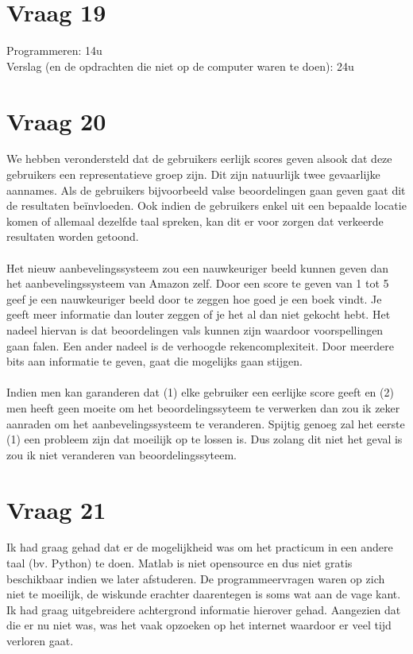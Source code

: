 \documentclass[11pt,a4paper]{article}
\begin{document}
\section*{Vraag 19}
Programmeren: 14u\\
Verslag (en de opdrachten die niet op de computer waren te doen): 24u 

\section*{Vraag 20}
We hebben verondersteld dat de gebruikers eerlijk scores geven alsook dat deze gebruikers een representatieve groep zijn. Dit zijn natuurlijk twee gevaarlijke aannames. Als de gebruikers bijvoorbeeld valse beoordelingen gaan geven gaat dit de resultaten beïnvloeden. Ook indien de gebruikers enkel uit een bepaalde locatie komen of allemaal dezelfde taal spreken, kan dit er voor zorgen dat verkeerde resultaten worden getoond.
\\
\\
Het nieuw aanbevelingssysteem zou een nauwkeuriger beeld kunnen geven dan het aanbevelingssysteem van Amazon zelf. Door een score te geven van 1 tot 5 geef je een nauwkeuriger beeld door te zeggen hoe goed je een boek vindt. Je geeft meer informatie dan louter zeggen of je het al dan niet gekocht hebt. Het nadeel hiervan is dat beoordelingen vals kunnen zijn waardoor voorspellingen gaan falen. Een ander nadeel is de verhoogde rekencomplexiteit. Door meerdere bits aan informatie te geven, gaat die mogelijks gaan stijgen.
\\
\\
Indien men kan garanderen dat (1) elke gebruiker een eerlijke score geeft en (2) men heeft geen moeite om het beoordelingssyteem te verwerken dan zou ik zeker aanraden om het aanbevelingssysteem te veranderen.
Spijtig genoeg zal het eerste (1) een probleem zijn dat moeilijk op te lossen is. Dus zolang dit niet het geval is zou ik niet veranderen van beoordelingssyteem.
\section*{Vraag 21}
Ik had graag gehad dat er de mogelijkheid was om het practicum in een andere taal (bv. Python) te doen. Matlab is niet opensource en dus niet gratis beschikbaar indien we later afstuderen.
De programmeervragen waren op zich niet te moeilijk, de wiskunde erachter daarentegen is soms wat aan de vage kant. Ik had graag uitgebreidere achtergrond informatie hierover gehad.
Aangezien dat die er nu niet was, was het vaak opzoeken op het internet waardoor er veel tijd verloren gaat.
\end{document}
